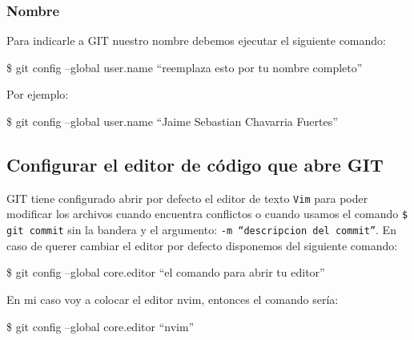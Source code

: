             \subsubsection{Nombre}
                Para indicarle a GIT nuestro nombre debemos ejecutar el siguiente comando:
                    \begin{lstlistings}
                        \$ git config --global user.name ``reemplaza esto por tu nombre completo''
                    \end{lstlistings}
                Por ejemplo:
                    \begin{lstlistings}
                        \$ git config --global user.name ``Jaime Sebastian Chavarria Fuertes''
                    \end{lstlistings}

    \subsection{Configurar el editor de c\'odigo que abre GIT}
        GIT tiene configurado abrir por defecto el editor de texto \texttt{Vim} para poder modificar los archivos cuando encuentra conflictos o cuando usamos el comando \texttt{\$ git commit} sin la bandera y el argumento: \texttt{-m ``descripcion del commit''}.
        En caso de querer cambiar el editor por defecto disponemos del siguiente comando:
            \begin{lstlistings}
                \$ git config --global core.editor ``el comando para abrir tu editor''
            \end{lstlistings}
        En mi caso voy a colocar el editor nvim, entonces el comando ser\'ia:
            \begin{lstlistings}
                \$ git config --global core.editor ``nvim''
            \end{lstlistings}
    
